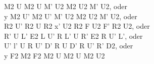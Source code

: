 M2 U M2 U M' U2 M2 U2 M' U2, oder\\
y M2 U' M2 U' M' U2 M2 U2 M' U2, oder\\
R2 U' R2 U R2 x' U2 R2 F U2 F' R2 U2, oder\\
R' U L' E2 L U' R L' U R' E2 R U' L', oder\\
U' l' U R U' D' R U D' R U' R' D2, oder\\
y F2 M2 F2 M2 U M2 U M2 U2\\
